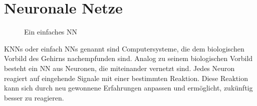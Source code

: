\section{Neuronale Netze}

\begin{figure}
  \centering
  \caption{Ein einfaches \acl{NN}}
  \label{fig:beispiel-nn}
\end{figure}

\Acp{KNN} oder einfach \acp{NN} genannt sind Computersysteme, die dem biologischen Vorbild des Gehirns nachempfunden sind. Analog zu seinem biologischen Vorbild besteht ein \ac{NN} aus Neuronen, die miteinander vernetzt sind. Jedes Neuron reagiert auf eingehende Signale mit einer bestimmten Reaktion. Diese Reaktion kann sich durch neu gewonnene Erfahrungen anpassen und ermöglicht, zukünftig besser zu reagieren.

